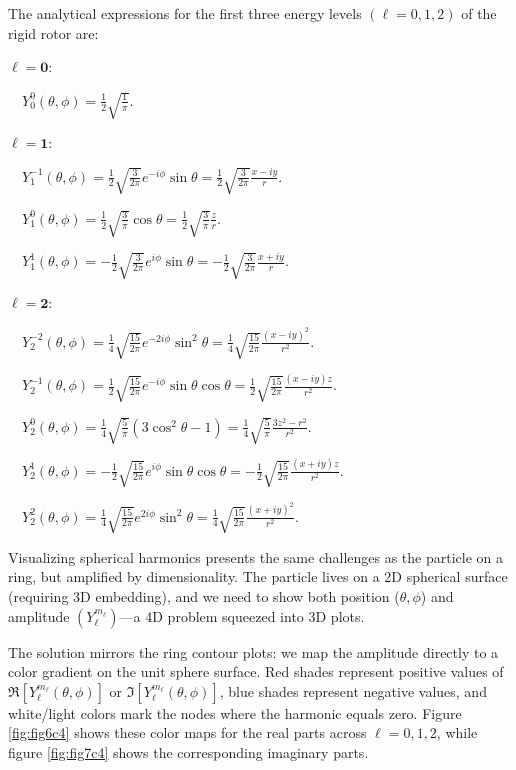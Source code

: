 \documentclass[
  english,
  9pt,
]{extbook}
\theoremstyle{definition}
\theoremstyle{definition}
\theoremstyle{definition}
\theoremstyle{definition}
\theoremstyle{remark}
\begin{document}
The analytical expressions for the first three energy levels \((\ell=0,1,2)\) of the rigid rotor
are:

\(\boldsymbol{\ell=0}:\)

\(\quad Y_0^0(\theta,\phi) = \frac{1}{2}\sqrt{\frac{1}{\pi}}.\)

\(\boldsymbol{\ell=1}:\)

\(\quad Y_1^{-1}(\theta,\phi) = \frac{1}{2}\sqrt{\frac{3}{2\pi}} e^{-i\phi} \sin\theta = \frac{1}{2}\sqrt{\frac{3}{2\pi}} \frac{x-iy}{r}.\)

\(\quad Y_1^{0}(\theta,\phi) = \frac{1}{2}\sqrt{\frac{3}{\pi}} \cos\theta = \frac{1}{2}\sqrt{\frac{3}{\pi}} \frac{z}{r}.\)

\(\quad Y_1^{1}(\theta,\phi) = -\frac{1}{2}\sqrt{\frac{3}{2\pi}} e^{i\phi} \sin\theta = -\frac{1}{2}\sqrt{\frac{3}{2\pi}} \frac{x+iy}{r}.\)

\(\boldsymbol{\ell=2}:\)

\(\quad Y_2^{-2}(\theta,\phi) = \frac{1}{4}\sqrt{\frac{15}{2\pi}} e^{-2i\phi} \sin^2\theta = \frac{1}{4}\sqrt{\frac{15}{2\pi}} \frac{(x-iy)^2}{r^2}.\)

\(\quad Y_2^{-1}(\theta,\phi) = \frac{1}{2}\sqrt{\frac{15}{2\pi}} e^{-i\phi} \sin\theta \cos\theta = \frac{1}{2}\sqrt{\frac{15}{2\pi}} \frac{(x-iy)z}{r^2}.\)

\(\quad Y_2^{0}(\theta,\phi) = \frac{1}{4}\sqrt{\frac{5}{\pi}} (3\cos^2\theta - 1) = \frac{1}{4}\sqrt{\frac{5}{\pi}} \frac{3z^2 - r^2}{r^2}.\)

\(\quad Y_2^{1}(\theta,\phi) = -\frac{1}{2}\sqrt{\frac{15}{2\pi}} e^{i\phi} \sin\theta \cos\theta = -\frac{1}{2}\sqrt{\frac{15}{2\pi}} \frac{(x+iy)z}{r^2}.\)

\(\quad Y_2^{2}(\theta,\phi) = \frac{1}{4}\sqrt{\frac{15}{2\pi}} e^{2i\phi} \sin^2\theta = \frac{1}{4}\sqrt{\frac{15}{2\pi}} \frac{(x+iy)^2}{r^2}.\)

Visualizing spherical harmonics presents the same challenges as the particle on a ring, but amplified by dimensionality. The particle lives on a 2D spherical surface (requiring 3D embedding), and we need to show both position (\(\theta,\phi\)) and amplitude \(\left(Y_\ell^{m_\ell}\right)\)---a 4D problem squeezed into 3D plots.

The solution mirrors the ring contour plots: we map the amplitude directly to a color gradient on the unit sphere surface. Red shades represent positive values of \(\Re\left[ Y_\ell^{m_\ell}(\theta,\phi)\right]\) or \(\Im \left[Y_\ell^{m_\ell}(\theta,\phi)\right]\), blue shades represent negative values, and white/light colors mark the nodes where the harmonic equals zero. Figure \ref{fig:fig6c4} shows these color maps for the real parts across \(\ell=0,1,2\), while figure \ref{fig:fig7c4} shows the corresponding imaginary parts.
\end{document}
